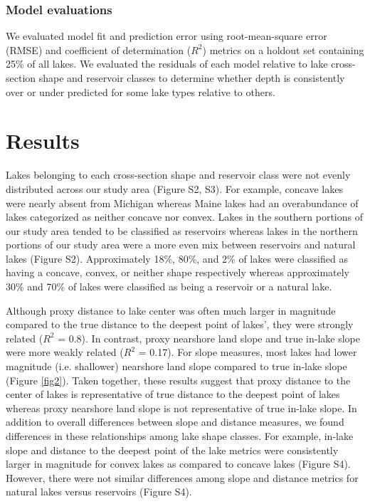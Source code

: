 \documentclass[draft]{agujournal2019}
\begin{document}
\subsubsection{Model evaluations}
\noindent
We evaluated model fit and prediction error using root-mean-square error (RMSE) and coefficient of determination ($R^2$) metrics on a holdout set containing 25\% of all lakes. We evaluated the residuals of each model relative to lake cross-section shape and reservoir classes to determine whether depth is consistently over or under predicted for some lake types relative to others.

\section{Results}
\noindent
Lakes belonging to each cross-section shape and reservoir class were not evenly distributed across our study area (Figure S2, S3). For example, concave lakes were nearly absent from Michigan whereas Maine lakes had an overabundance of lakes categorized as neither concave nor convex. Lakes in the southern portions of our study area tended to be classified as reservoirs whereas lakes in the northern portions of our study area were a more even mix between reservoirs and natural lakes (Figure S2). Approximately 18\%, 80\%, and 2\% of lakes were classified as having a concave, convex, or neither shape respectively whereas approximately 30\% and 70\% of lakes were classified as being a reservoir or a natural lake.

Although proxy distance to lake center was often much larger in magnitude compared to the true distance to the deepest point of lakes’, they were strongly related ($R^2$ = 0.8). In contrast, proxy nearshore land slope and true in-lake slope were more weakly related ($R^2$ = 0.17). For slope measures, most lakes had lower magnitude (i.e. shallower) nearshore land slope compared to true in-lake slope (Figure \ref{fig2}). Taken together, these results suggest that proxy distance to the center of lakes is representative of true distance to the deepest point of lakes whereas proxy nearshore land slope is not representative of true in-lake slope. In addition to overall differences between slope and distance measures, we found differences in these relationships among lake shape classes. For example, in-lake slope and distance to the deepest point of the lake metrics were consistently larger in magnitude for convex lakes as compared to concave lakes (Figure S4). However,  there were not similar differences among slope and distance metrics for natural lakes versus reservoirs (Figure S4).
\end{document}
